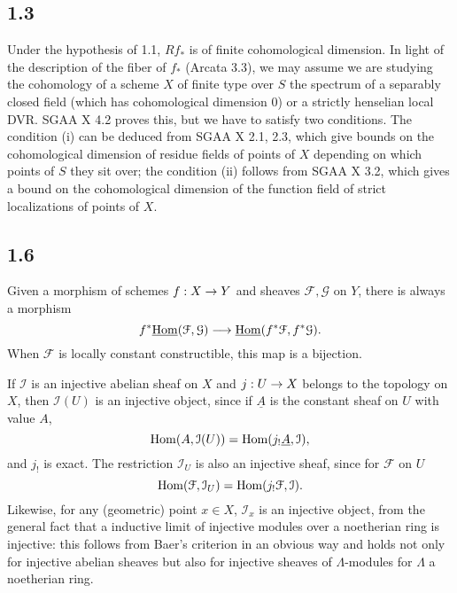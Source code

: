\documentclass[deligne.tex]{subfiles}
\begin{document}
	\subsection*{1.3}\label{thfin:1.3} Under the hypothesis of 1.1, $Rf_*$ is of finite
	cohomological dimension. In light of the description of the fiber of
	$f_*$ (Arcata 3.3), we may assume we are studying the cohomology of a
	scheme $X$ of finite type over $S$ the spectrum of a separably closed 
	field (which has cohomological dimension 0)
	or a strictly henselian local DVR.
	SGAA X 4.2 proves this, but we have to satisfy two conditions.
	The condition (i) can be deduced from SGAA X 2.1, 2.3, which give
	bounds on the cohomological dimension of residue
	fields of points of $X$ depending on which points of $S$ they sit over;
	the condition (ii) follows from SGAA X 3.2, which gives a bound on the
	cohomological dimension of the function field of strict localizations
	of points of $X$.
	
	\subsection*{1.6}\label{thfin:1.6}
	Given a morphism of schemes $f:X\rightarrow Y$ and sheaves $\mathcal F,\mathcal G$
	on $Y$, there is always a morphism
	\begin{equation*}
		f^*\underline{\operatorname{Hom}}(\mathcal F,\mathcal G)\longrightarrow
		\underline{\operatorname{Hom}}(f^*\mathcal F,f^*\mathcal G).
	\end{equation*}
	When $\mathcal F$ is locally constant constructible, this map is a 
	bijection.
	
	If $\mathcal I$ is an injective abelian sheaf on $X$ and $j:U\rightarrow X$ 
	belongs to the topology on $X$, then $\mathcal I(U)$ is an injective 
	object, since if $\underline A$ is the constant sheaf on $U$ with value 
	$A$,
	\begin{equation*}
		\operatorname{Hom}(A,\mathcal I(U))=\operatorname{Hom}(j_!\underline A,\mathcal I),
	\end{equation*}
	and $j_!$ is exact.
	The restriction $\mathcal I_U$ is also an injective sheaf, since for
	$\mathcal F$ on $U$
	\begin{equation*}
		\operatorname{Hom}(\mathcal F,\mathcal I_U)=\operatorname{Hom}(j_!\mathcal F,\mathcal I).
	\end{equation*}
	Likewise, for any (geometric) point $x\in X$, $\mathcal I_x$ is an
	injective object, from the general fact that a inductive limit of 
	injective modules over a noetherian ring is injective: this follows from
	Baer's criterion in an obvious way and holds not only for injective
	abelian sheaves but also for injective sheaves of $\Lambda$-modules
	for $\Lambda$ a noetherian ring.
	
\end{document}
